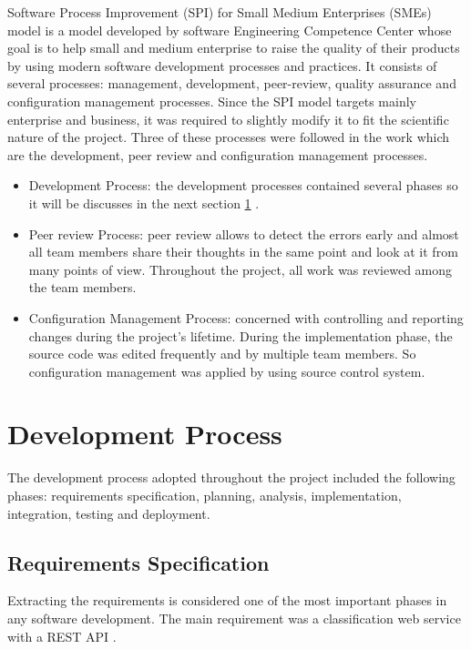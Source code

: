 Software Process Improvement (SPI) for Small Medium Enterprises (SMEs)
model is a model developed by software Engineering Competence Center
whose goal is to help small and medium enterprise to raise the quality of
their products by using modern software development processes and practices. 
It consists of several processes: management, development, peer-review, 
quality assurance and configuration management processes. Since
the SPI model targets mainly enterprise and business, it was required to
slightly modify it to fit the scientific nature of the project. Three of these 
processes were followed in the work which are the development, peer review and
configuration management processes.

\begin{itemize}
  \item Development Process: the development processes contained several
  phases so it will be discusses in the next section \ref{sec:5_dev_process} .
  \item Peer review Process: peer review allows to detect the errors early and
  almost all team members share their thoughts in the same point and
  look at it from many points of view. Throughout the project, all work
  was reviewed among the team members.
  \item Configuration Management Process: concerned with controlling and
  reporting changes during the project's lifetime. During the implementation 
  phase, the source code was edited frequently and by multiple
  team members. So configuration management was applied by using
  source control system.
\end{itemize}

\section{Development Process}
\label{sec:5_dev_process}

The development process adopted throughout the project included the following
phases: requirements specification, planning, analysis, implementation, integration,
 testing and deployment.

\subsection{Requirements Specification}
Extracting the requirements is considered one of the most important phases
in any software development. The main requirement was a classification web 
service with a REST API \cite{REST}.
